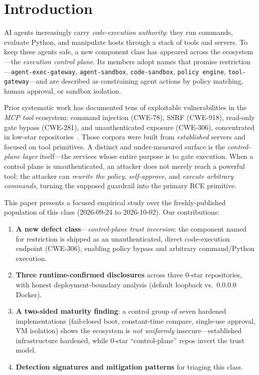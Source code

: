 \documentclass{llncs}
\begin{document}
\section{Introduction}\label{sec:intro}

AI agents increasingly carry \emph{code-execution authority}: they run commands, evaluate Python, and manipulate hosts through a stack of tools and servers. To keep these agents safe, a new component class has appeared across the ecosystem---the \emph{execution control plane}. Its members adopt names that promise restriction---\texttt{agent-exec-gateway}, \texttt{agent-sandbox}, \texttt{code-sandbox}, \texttt{policy engine}, \texttt{tool-gateway}---and are described as constraining agent actions by policy matching, human approval, or sandbox isolation.

Prior systematic work has documented tens of exploitable vulnerabilities in the \emph{MCP tool} ecosystem: command injection (CWE-78), SSRF (CWE-918), read-only gate bypass (CWE-281), and unauthenticated exposure (CWE-306), concentrated in low-star repositories~\cite{mcp-spec,a2a-spec,chen2026mcp}. Those corpora were built from \emph{established} servers and focused on tool primitives. A distinct and under-measured surface is the \emph{control-plane layer} itself---the services whose entire purpose is to gate execution. When a control plane is unauthenticated, an attacker does not merely reach a powerful tool; the attacker can \emph{rewrite the policy}, \emph{self-approve}, and \emph{execute arbitrary commands}, turning the supposed guardrail into the primary RCE primitive.

This paper presents a focused empirical study over the freshly-published population of this class (2026-09-24 to 2026-10-02). Our contributions:

\begin{enumerate}
    \item \textbf{A new defect class}---\emph{control-plane trust inversion}: the component named for restriction is shipped as an unauthenticated, direct code-execution endpoint (CWE-306), enabling policy bypass and arbitrary command/Python execution.
    \item \textbf{Three runtime-confirmed disclosures} across three 0-star repositories, with honest deployment-boundary analysis (default loopback vs.\ 0.0.0.0 Docker).
    \item \textbf{A two-sided maturity finding}: a control group of seven hardened implementations (fail-closed boot, constant-time compare, single-use approval, VM isolation) shows the ecosystem is \emph{not uniformly} insecure---established infrastructure hardened, while 0-star ``control-plane'' repos invert the trust model.
    \item \textbf{Detection signatures and mitigation patterns} for triaging this class.
\end{enumerate}
\end{document}

